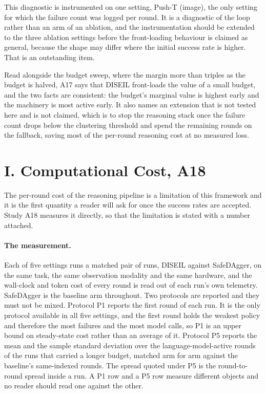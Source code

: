 \documentclass[letterpaper]{article}
\begin{document}
This diagnostic is instrumented on one setting, Push-T (image), the only setting for
which the failure count was logged per round. It is a diagnostic of the loop rather than
an arm of an ablation, and the instrumentation should be extended to the three ablation
settings before the front-loading behaviour is claimed as general, because the shape may
differ where the initial success rate is higher. That is an outstanding item.

Read alongside the budget sweep, where the margin more than triples as the budget is
halved, A17 says that DISEIL front-loads the value of a small budget, and the two facts
are consistent: the budget's marginal value is highest early and the machinery is most
active early. It also names an extension that is not tested here and is not claimed,
which is to stop the reasoning stack once the failure count drops below the clustering
threshold and spend the remaining rounds on the fallback, saving most of the per-round
reasoning cost at no measured loss.

\section{I. Computational Cost, A18}

The per-round cost of the reasoning pipeline is a limitation of this framework and it is
the first quantity a reader will ask for once the success rates are accepted. Study A18
measures it directly, so that the limitation is stated with a number attached.

\paragraph{The measurement.} Each of five settings runs a matched pair of runs, DISEIL
against SafeDAgger, on the same task, the same observation modality and the same
hardware, and the wall-clock and token cost of every round is read out of each run's own
telemetry. SafeDAgger is the baseline arm throughout. Two protocols are reported and
they must not be mixed. Protocol P1 reports the first round of each run. It is the only
protocol available in all five settings, and the first round holds the weakest policy
and therefore the most failures and the most model calls, so P1 is an upper bound on
steady-state cost rather than an average of it. Protocol P5 reports the mean and the
sample standard deviation over the language-model-active rounds of the runs that carried
a longer budget, matched arm for arm against the baseline's same-indexed rounds. The
spread quoted under P5 is the round-to-round spread inside a run. A P1 row and a P5 row
measure different objects and no reader should read one against the other.
\end{document}
